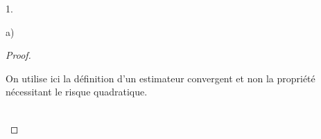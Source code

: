 \documentclass[11pt]{article}%
\begin{document}
\begin{noliste}{1.}
\begin{noliste}{a)}
\begin{proof}
    \begin{remark}%
    On utilise ici la définition d'un estimateur convergent et non la 
    propriété nécessitant le risque quadratique.
    \end{remark}~\\[-1.4cm]
    \end{proof}
  \end{noliste}
\end{noliste}

\end{document}
